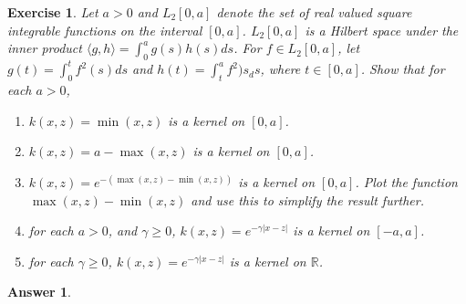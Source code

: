 \documentclass[12pt]{article}
\theoremstyle{colon}
\newtheorem{exercise}{Exercise}
\newtheorem*{answer}{Answer}
\begin{document}
\begin{exercise}
  Let $a > 0$ and $L_2 [0,a]$ denote the set of real valued square integrable functions on the interval $[0,a]$. $L_2[0,a]$ is a Hilbert space under the inner product $\langle g, h \rangle = \int_0^a g(s) h(s) ds$. For $f \in L_2[0,a]$, let $g(t) = \int_0^t f^2(s) ds$ and $h(t) = \int_t^a f^2)s_ ds$, where $t \in [0,a]$. Show that for each $a > 0$,

  \begin{enumerate}[label=\alph*)]
    \item $k(x,z) = \min(x,z)$ is a kernel on $[0,a]$.

    \item $k(x,z) = a - \max(x,z)$ is a kernel on $[0,a]$.

    \item $k(x,z) = e^{-(\max(x,z) - \min(x,z))}$ is a kernel on $[0,a]$. Plot the function $\max(x,z) - \min(x,z)$ and use this to simplify the result further.

    \item for each $a > 0$, and $\gamma \geq 0$, $k(x,z) = e^{-\gamma \lvert x - z \rvert}$ is a kernel on $[-a, a]$.

    \item for each $\gamma \geq 0$, $k(x,z) = e^{-\gamma \lvert x - z \rvert}$ is a kernel on $\mathbb{R}$.
  \end{enumerate}
\end{exercise}

\begin{answer}

\end{answer}
\end{document}
